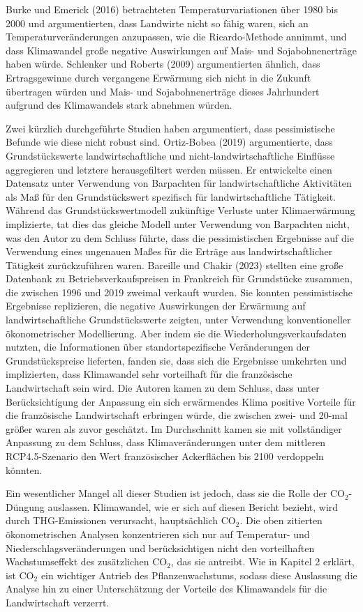 \documentclass[12pt,paper=a4,DIV=12,parskip=never,chapterprefix=false,headings=standardclasses]{scrreprt}
\begin{document}
Burke und Emerick (2016) betrachteten Temperaturvariationen über 1980 bis 2000 und argumentierten, dass Landwirte nicht so fähig waren, sich an Temperaturveränderungen anzupassen, wie die Ricardo-Methode annimmt, und dass Klimawandel große negative Auswirkungen auf Mais- und Sojabohnenerträge haben würde. Schlenker und Roberts (2009) argumentierten ähnlich, dass Ertragsgewinne durch vergangene Erwärmung sich nicht in die Zukunft übertragen würden und Mais- und Sojabohnenerträge dieses Jahrhundert aufgrund des Klimawandels stark abnehmen würden.

Zwei kürzlich durchgeführte Studien haben argumentiert, dass pessimistische Befunde wie diese nicht robust sind. Ortiz-Bobea (2019) argumentierte, dass Grundstückswerte landwirtschaftliche und nicht-landwirtschaftliche Einflüsse aggregieren und letztere herausgefiltert werden müssen. Er entwickelte einen Datensatz unter Verwendung von Barpachten für landwirtschaftliche Aktivitäten als Maß für den Grundstückswert spezifisch für landwirtschaftliche Tätigkeit. Während das Grundstückswertmodell zukünftige Verluste unter Klimaerwärmung implizierte, tat dies das gleiche Modell unter Verwendung von Barpachten nicht, was den Autor zu dem Schluss führte, dass die pessimistischen Ergebnisse auf die Verwendung eines ungenauen Maßes für die Erträge aus landwirtschaftlicher Tätigkeit zurückzuführen waren. Bareille und Chakir (2023) stellten eine große Datenbank zu Betriebsverkaufspreisen in Frankreich für Grundstücke zusammen, die zwischen 1996 und 2019 zweimal verkauft wurden. Sie konnten pessimistische Ergebnisse replizieren, die negative Auswirkungen der Erwärmung auf landwirtschaftliche Grundstückswerte zeigten, unter Verwendung konventioneller ökonometrischer Modellierung. Aber indem sie die Wiederholungsverkaufsdaten nutzten, die Informationen über standortspezifische Veränderungen der Grundstückspreise lieferten, fanden sie, dass sich die Ergebnisse umkehrten und implizierten, dass Klimawandel sehr vorteilhaft für die französische Landwirtschaft sein wird. Die Autoren kamen zu dem Schluss, dass unter Berücksichtigung der Anpassung ein sich erwärmendes Klima positive Vorteile für die französische Landwirtschaft erbringen würde, die zwischen zwei- und 20-mal größer waren als zuvor geschätzt. Im Durchschnitt kamen sie mit vollständiger Anpassung zu dem Schluss, dass Klimaveränderungen unter dem mittleren RCP4.5-Szenario den Wert französischer Ackerflächen bis 2100 verdoppeln könnten.

Ein wesentlicher Mangel all dieser Studien ist jedoch, dass sie die Rolle der CO$_2$-Düngung auslassen. Klimawandel, wie er sich auf diesen Bericht bezieht, wird durch THG-Emissionen verursacht, hauptsächlich CO$_2$. Die oben zitierten ökonometrischen Analysen konzentrieren sich nur auf Temperatur- und Niederschlagsveränderungen und berücksichtigen nicht den vorteilhaften Wachstumseffekt des zusätzlichen CO$_2$, das sie antreibt. Wie in Kapitel 2 erklärt, ist CO$_2$ ein wichtiger Antrieb des Pflanzenwachstums, sodass diese Auslassung die Analyse hin zu einer Unterschätzung der Vorteile des Klimawandels für die Landwirtschaft verzerrt.
\end{document}
